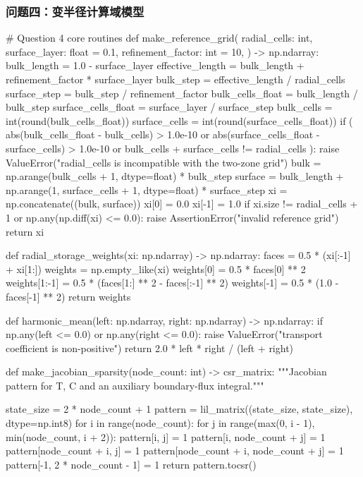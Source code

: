 \documentclass[withoutpreface,bwprint]{cumcmthesis}
\begin{document}
\subsubsection*{\centering 问题四：变半径计算域模型}
\begin{PythonCode}
# Question 4 core routines
def make_reference_grid(
    radial_cells: int,
    surface_layer: float = 0.1,
    refinement_factor: int = 10,
) -> np.ndarray:
    bulk_length = 1.0 - surface_layer
    effective_length = bulk_length + refinement_factor * surface_layer
    bulk_step = effective_length / radial_cells
    surface_step = bulk_step / refinement_factor
    bulk_cells_float = bulk_length / bulk_step
    surface_cells_float = surface_layer / surface_step
    bulk_cells = int(round(bulk_cells_float))
    surface_cells = int(round(surface_cells_float))
    if (
        abs(bulk_cells_float - bulk_cells) > 1.0e-10
        or abs(surface_cells_float - surface_cells) > 1.0e-10
        or bulk_cells + surface_cells != radial_cells
    ):
        raise ValueError("radial_cells is incompatible with the two-zone grid")
    bulk = np.arange(bulk_cells + 1, dtype=float) * bulk_step
    surface = bulk_length + np.arange(1, surface_cells + 1, dtype=float) * surface_step
    xi = np.concatenate((bulk, surface))
    xi[0] = 0.0
    xi[-1] = 1.0
    if xi.size != radial_cells + 1 or np.any(np.diff(xi) <= 0.0):
        raise AssertionError("invalid reference grid")
    return xi


def radial_storage_weights(xi: np.ndarray) -> np.ndarray:
    faces = 0.5 * (xi[:-1] + xi[1:])
    weights = np.empty_like(xi)
    weights[0] = 0.5 * faces[0] ** 2
    weights[1:-1] = 0.5 * (faces[1:] ** 2 - faces[:-1] ** 2)
    weights[-1] = 0.5 * (1.0 - faces[-1] ** 2)
    return weights


def harmonic_mean(left: np.ndarray, right: np.ndarray) -> np.ndarray:
    if np.any(left <= 0.0) or np.any(right <= 0.0):
        raise ValueError("transport coefficient is non-positive")
    return 2.0 * left * right / (left + right)


def make_jacobian_sparsity(node_count: int) -> csr_matrix:
    """Jacobian pattern for T, C and an auxiliary boundary-flux integral."""

    state_size = 2 * node_count + 1
    pattern = lil_matrix((state_size, state_size), dtype=np.int8)
    for i in range(node_count):
        for j in range(max(0, i - 1), min(node_count, i + 2)):
            pattern[i, j] = 1
            pattern[i, node_count + j] = 1
            pattern[node_count + i, j] = 1
            pattern[node_count + i, node_count + j] = 1
    pattern[-1, 2 * node_count - 1] = 1
    return pattern.tocsr()



\end{PythonCode}
\end{document}
